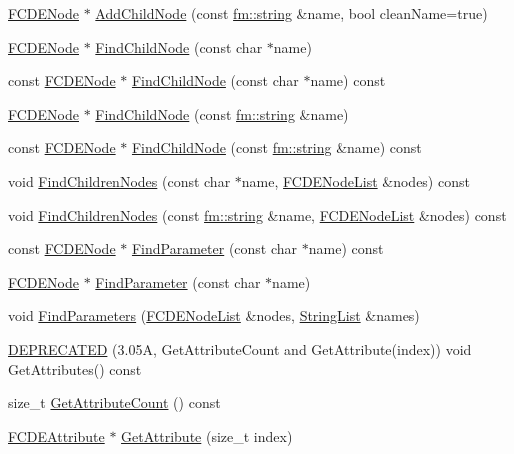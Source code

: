 \begin{DoxyCompactItemize}
\item 
\hyperlink{classFCDENode}{FCDENode} $\ast$ \hyperlink{classFCDENode_a7f7cb8de1de5d228907b08768e0fefc1}{AddChildNode} (const \hyperlink{classfm_1_1stringT}{fm::string} \&name, bool cleanName=true)
\item 
\hyperlink{classFCDENode}{FCDENode} $\ast$ \hyperlink{classFCDENode_aeb0ce9fab6a7ad45e2de229995886d37}{FindChildNode} (const char $\ast$name)
\item 
const \hyperlink{classFCDENode}{FCDENode} $\ast$ \hyperlink{classFCDENode_a238f318027de680126d6334394b18b25}{FindChildNode} (const char $\ast$name) const 
\item 
\hyperlink{classFCDENode}{FCDENode} $\ast$ \hyperlink{classFCDENode_a84c7b53de2158ad6cd8401b5d04d3359}{FindChildNode} (const \hyperlink{classfm_1_1stringT}{fm::string} \&name)
\item 
const \hyperlink{classFCDENode}{FCDENode} $\ast$ \hyperlink{classFCDENode_a77ce270d4c8305db113ca75b045bad49}{FindChildNode} (const \hyperlink{classfm_1_1stringT}{fm::string} \&name) const 
\item 
void \hyperlink{classFCDENode_a4d8701eef19fb20fb9c5d125cea81099}{FindChildrenNodes} (const char $\ast$name, \hyperlink{classfm_1_1pvector}{FCDENodeList} \&nodes) const 
\item 
void \hyperlink{classFCDENode_a84f861c699114366525040e683ef7abf}{FindChildrenNodes} (const \hyperlink{classfm_1_1stringT}{fm::string} \&name, \hyperlink{classfm_1_1pvector}{FCDENodeList} \&nodes) const 
\item 
const \hyperlink{classFCDENode}{FCDENode} $\ast$ \hyperlink{classFCDENode_a094cb64a16feaab717805db7cb4e4336}{FindParameter} (const char $\ast$name) const 
\item 
\hyperlink{classFCDENode}{FCDENode} $\ast$ \hyperlink{classFCDENode_a4d8ca649fdd9403c360fe9b868fd37d9}{FindParameter} (const char $\ast$name)
\item 
void \hyperlink{classFCDENode_a3b62649f0e7658c9493a643134bcf11a}{FindParameters} (\hyperlink{classfm_1_1pvector}{FCDENodeList} \&nodes, \hyperlink{classfm_1_1vector}{StringList} \&names)
\item 
\hyperlink{classFCDENode_a880d166669a134846321eadb21c634b5}{DEPRECATED} (3.05A, GetAttributeCount and GetAttribute(index)) void GetAttributes() const 
\item 
size\_\-t \hyperlink{classFCDENode_a7615bf8b5720c9a2d483cf6beba795c2}{GetAttributeCount} () const 
\item 
\hyperlink{classFCDEAttribute}{FCDEAttribute} $\ast$ \hyperlink{classFCDENode_ac0ba7eb643eb141adaa789270d33d296}{GetAttribute} (size\_\-t index)

\end{DoxyCompactItemize}
